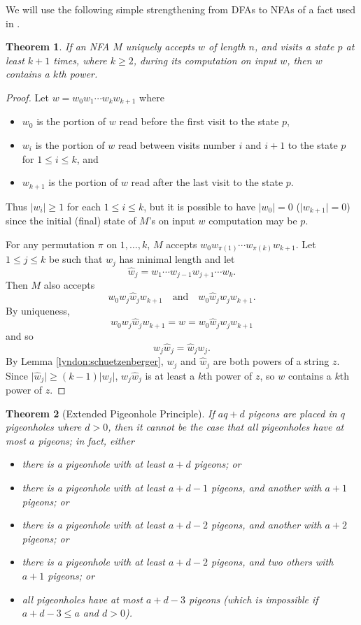 \documentclass[12pt]{article}
\newcommand{\abs}[1]{\lvert#1\rvert}
\theoremstyle{plain}
\newtheorem{thm}{Theorem}
\theoremstyle{definition}
\theoremstyle{remark}
\begin{document}
			We will use the following simple strengthening from DFAs to NFAs of a fact used in \cite[Theorem 9]{MR1897300}.
			\begin{thm}\label{nfa9fact}
				If an NFA $M$ uniquely accepts $w$ of length $n$, and visits a state $p$ at least $k+1$ times, where $k\ge 2$,
				during its computation on input $w$,
				then $w$ contains a $k$th power.
			\end{thm}
			\begin{proof}
				Let $w=w_0 w_1 \cdots w_k w_{k+1}$ where
				\begin{itemize}
					\item $w_0$ is the portion of $w$ read before the first visit to the state $p$,
					\item $w_i$ is the portion of $w$ read between visits number $i$ and $i+1$ to the state $p$ for $1\le i\le k$, and
					\item $w_{k+1}$ is the portion of $w$ read after the last visit to the state $p$.
				\end{itemize}
				Thus $\abs{w_i}\ge 1$ for each $1\le i\le k$, but it is possible to have $\abs{w_0}=0$ ($\abs{w_{k+1}}=0$) since the
				initial (final) state of $M$'s on input $w$ computation may be $p$.

				For any permutation $\pi$ on ${1, \ldots, k}$, $M$ accepts $w_0w_{\pi(1)}\cdots w_{\pi(k)}w_{k+1}$.
				Let $1\le j\le k$ be such that $w_j$ has minimal length and let
				\[
					\hat w_j = w_1\cdots w_{j-1}w_{j+1}\cdots w_k.
				\]
				Then $M$ also accepts
				\[
					w_0w_j \hat w_j w_{k+1}\quad\mathrm{and}\quad w_0\hat w_j w_j w_{k+1}.
				\]
				By uniqueness,
				\[
					w_0w_j \hat w_j w_{k+1} = w = w_0\hat w_j w_j w_{k+1}
				\]
				and so
				\[
					w_j \hat w_j = \hat w_j w_j.
				\]
				By Lemma \ref{lyndon:schuetzenberger}, $w_j$ and $\hat w_j$ are both powers of a string $z$.
				Since $\abs{\hat w_j}\ge (k-1)\abs{w_j}$, $w_j\hat w_j$ is at least a $k$th power of $z$, so $w$ contains a $k$th power of $z$.
			\end{proof}
			\begin{thm}[Extended Pigeonhole Principle]\label{php}
				If $aq+d$ pigeons are placed in $q$ pigeonholes where $d>0$,
				then it cannot be the case that all pigeonholes have at most $a$ pigeons;
				in fact, either
				\begin{itemize}
					\item{} there is a pigeonhole with at least $a+d$ pigeons; or
					\item{} there is a pigeonhole with at least $a+d-1$ pigeons, and another with $a+1$ pigeons; or
					\item{} there is a pigeonhole with at least $a+d-2$ pigeons, and another with $a+2$ pigeons; or		
					\item{} there is a pigeonhole with at least $a+d-2$ pigeons, and two others with $a+1$ pigeons; or
					\item{} all pigeonholes have at most $a+d-3$ pigeons (which is impossible if $a+d-3 \le a$ and $d>0$).
				\end{itemize}
			\end{thm}
\end{document}
